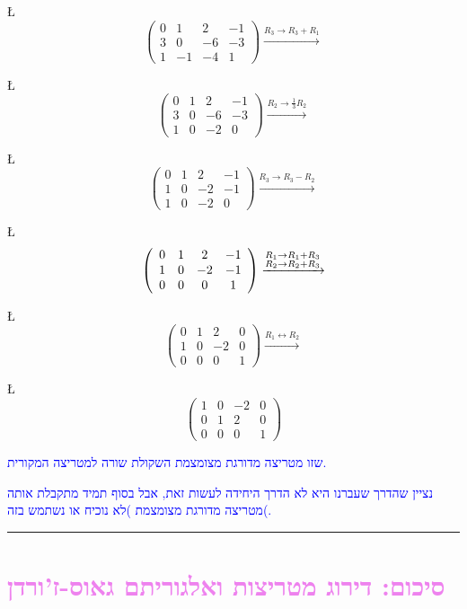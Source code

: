 \documentclass[english,hebrew]{article}
\begin{document}
\L{%
\[
\left(\begin{array}{cccc}
0 & 1 & 2 & -1\\
3 & 0 & -6 & -3\\
1 & -1 & -4 & 1
\end{array}\right)\xrightarrow{R_{3}\to R_{3}+R_{1}}
\]
}%

\L{%
\[
\left(\begin{array}{cccc}
0 & 1 & 2 & -1\\
3 & 0 & -6 & -3\\
1 & 0 & -2 & 0
\end{array}\right)\xrightarrow{R_{2}\to\frac{1}{3}R_{2}}
\]
}%

\L{%
\[
\left(\begin{array}{cccc}
0 & 1 & 2 & -1\\
1 & 0 & -2 & -1\\
1 & 0 & -2 & 0
\end{array}\right)\xrightarrow{R_{3}\to R_{3}-R_{2}}
\]
}%

\L{%
\[
\left(\begin{array}{cccc}
0 & 1 & 2 & -1\\
1 & 0 & -2 & -1\\
0 & 0 & 0 & 1
\end{array}\right)\xrightarrow{\begin{subarray}{l}
R_{1}\to R_{1}+R_{3}\\
R_{2}\to R_{2}+R_{3}
\end{subarray}}
\]
}%

\L{%
\[
\left(\begin{array}{cccc}
0 & 1 & 2 & 0\\
1 & 0 & -2 & 0\\
0 & 0 & 0 & 1
\end{array}\right)\xrightarrow{R_{1}\leftrightarrow R_{2}}
\]
}%

\L{%
\[
\left(\begin{array}{cccc}
1 & 0 & -2 & 0\\
0 & 1 & 2 & 0\\
0 & 0 & 0 & 1
\end{array}\right)
\]
}%

\textcolor{blue}{שזו מטריצה מדורגת מצומצמת השקולת שורה למטריצה המקורית.}

\textcolor{blue}{נציין שהדרך שעברנו היא לא הדרך היחידה לעשות זאת,
אבל בסוף תמיד מתקבלת אותה מטריצה מדורגת מצומצמת )לא נוכיח או נשתמש
בזה(.}

\rule{1\linewidth}{1.5pt}

\section*{\textcolor{violet}{סיכום: דירוג מטריצות ואלגוריתם גאוס-ז'ורדן}}
\end{document}
